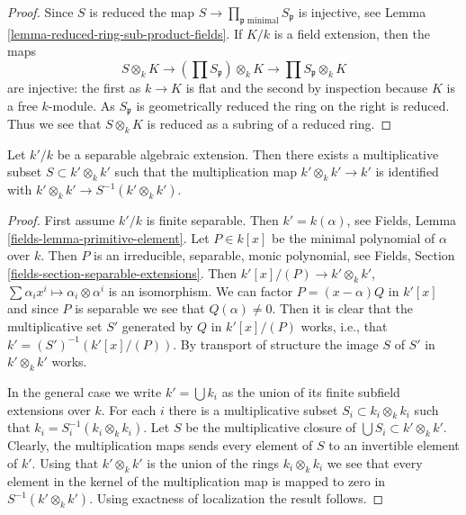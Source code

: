\begin{proof}
Since $S$ is reduced the map
$S \to \prod_{\mathfrak p\text{ minimal}} S_{\mathfrak p}$
is injective, see
Lemma \ref{lemma-reduced-ring-sub-product-fields}.
If $K/k$ is a field extension, then the maps
$$
S \otimes_k K \to (\prod S_\mathfrak p) \otimes_k K \to
\prod S_\mathfrak p \otimes_k K
$$
are injective: the first as $k \to K$ is flat and the second by inspection
because $K$ is a free $k$-module. As $S_\mathfrak p$ is geometrically
reduced the ring on the right is reduced. Thus we see that $S \otimes_k K$
is reduced as a subring of a reduced ring.
\end{proof}

\begin{lemma}
\label{lemma-separable-algebraic-diagonal}
Let $k'/k$ be a separable algebraic extension.
Then there exists a multiplicative subset $S \subset k' \otimes_k k'$
such that the multiplication map $k' \otimes_k k' \to k'$
is identified with $k' \otimes_k k' \to S^{-1}(k' \otimes_k k')$.
\end{lemma}

\begin{proof}
First assume $k'/k$ is finite separable. Then $k' = k(\alpha)$,
see Fields, Lemma \ref{fields-lemma-primitive-element}.
Let $P \in k[x]$ be the minimal polynomial of $\alpha$ over $k$.
Then $P$ is an irreducible, separable, monic polynomial, see
Fields, Section \ref{fields-section-separable-extensions}.
Then $k'[x]/(P) \to k' \otimes_k k'$,
$\sum \alpha_i x^i \mapsto \alpha_i \otimes \alpha^i$ is an isomorphism.
We can factor $P = (x - \alpha) Q$ in $k'[x]$ and since $P$
is separable we see that $Q(\alpha) \not = 0$.
Then it is clear that the multiplicative set $S'$ generated by
$Q$ in $k'[x]/(P)$ works, i.e., that $k' = (S')^{-1}(k'[x]/(P))$.
By transport of structure the image $S$ of $S'$ in $k' \otimes_k k'$
works.

\medskip\noindent
In the general case we write $k' = \bigcup k_i$ as the union
of its finite subfield extensions over $k$. For each $i$ there
is a multiplicative subset $S_i \subset k_i \otimes_k k_i$
such that $k_i = S_i^{-1}(k_i \otimes_k k_i)$. Let
$S$ be the multiplicative closure of $\bigcup S_i \subset k' \otimes_k k'$.
Clearly, the multiplication maps sends every element of $S$
to an invertible element of $k'$. Using that $k' \otimes_k k'$
is the union of the rings $k_i \otimes_k k_i$ we see that
every element in the kernel of the multiplication map is mapped to zero
in $S^{-1}(k' \otimes_k k')$. Using exactness of localization
the result follows.
\end{proof}

